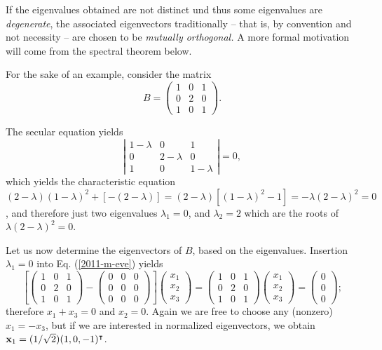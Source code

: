 If the eigenvalues obtained are not distinct und thus some eigenvalues are {\em degenerate},
the associated eigenvectors traditionally -- that is, by convention and not necessity -- are chosen to be
{\em mutually orthogonal.}
A more formal motivation will come from the spectral theorem below.


{\color{blue}
\bexample
For the sake of an example, consider  the
{matrix}
\begin{equation}
B=
\begin{pmatrix}
1&0&1\\
0&2&0\\
1&0&1
\end{pmatrix}.
\label{2017-m-ch-fdvs-e-eev2}
\end{equation}

The secular equation yields
$$
\left|
\begin{matrix}
1-\lambda &0&1\\
0&2-\lambda &0\\
1&0&1-\lambda
\end{matrix}
\right| = 0,
$$
which yields the characteristic equation
$
(2-\lambda )(1-\lambda )^2 +[-(2-\lambda )]=
(2-\lambda )[(1-\lambda )^2 -1]=
-\lambda (2-\lambda )^2 =0$,
and therefore just two  eigenvalues
$\lambda_1=0$,  and
$\lambda_2=2$ which are the roots of $\lambda (2-\lambda )^2 =0$.

Let us now determine the eigenvectors of $B$, based on the eigenvalues.
Insertion  $\lambda_1=0$ into Eq. (\ref{2011-m-eve})  yields
\begin{equation}
\left[
\begin{pmatrix}
1&0&1\\
0&2&0\\
1&0&1
\end{pmatrix}  -
\begin{pmatrix}
0&0&0\\
0&0&0\\
0&0&0
\end{pmatrix}
\right]
\begin{pmatrix}
x_1\\
x_2\\
x_3
\end{pmatrix}
=
\begin{pmatrix}
1&0&1\\
0&2&0\\
1&0&1
\end{pmatrix}
\begin{pmatrix}
x_1\\
x_2\\
x_3
\end{pmatrix}
=
\begin{pmatrix}
0\\
0\\
0
\end{pmatrix}
;
\end{equation}
therefore $x_1+x_3=0$ and $x_2=0$.
Again we are free to choose any (nonzero) $x_1=-x_3$,
but if we are interested in normalized eigenvectors, we obtain
${\bf x}_1 =(1/\sqrt{2})(1,0,-1)^\intercal $.

}
